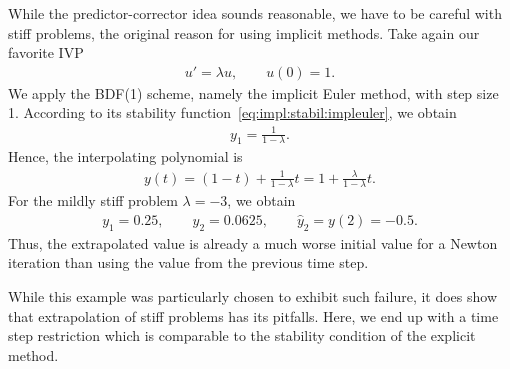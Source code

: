 \begin{example}
  While the predictor-corrector idea sounds reasonable, we have to be
  careful with stiff problems, the original reason for using implicit
  methods. Take again our favorite IVP
  \begin{gather*}
    u' = \lambda u,
    \qquad u(0) = 1.
  \end{gather*}
  We apply the BDF(1) scheme, namely the implicit Euler method, with
  step size 1. According to its stability
  function~\eqref{eq:impl:stabil:impleuler}, we obtain
  \begin{gather*}
    y_1 = \frac1{1-\lambda}.
  \end{gather*}
  Hence, the interpolating polynomial is
  \begin{gather*}
    y(t) = (1-t) + \frac1{1-\lambda} t = 1 + \frac{\lambda}{1-\lambda}t.
  \end{gather*}
  For the mildly stiff problem $\lambda = -3$, we obtain
  \begin{gather*}
    y_1 = 0.25, \qquad y_2 = 0.0625,
    \qquad \hat y_2 = y(2) = -0.5.
  \end{gather*}
  Thus, the extrapolated value is already a much worse initial value
  for a Newton iteration than using the value from the previous time
  step.
  
  While this example was particularly chosen to exhibit such failure,
  it does show that extrapolation of stiff problems has its
  pitfalls. Here, we end up with a time step restriction which is
  comparable to the stability condition of the explicit method.
\end{example}


